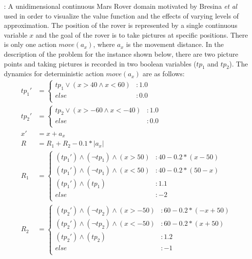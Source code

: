 \MarsRoverUni:
A unidimensional continuous Mars Rover domain motivated by
Bresina {\it et al}~\cite{bresina02} used in order to visualize the
value function and the effects of varying levels of approximation.
The position of the rover is represented by a single continuous
variable $x$ and the goal of the rover is to take pictures at
specific positions.  There is only one action $\mathit{move}(a_x)$,
where $a_x$ is the movement distance. In the description of the
problem for the instance shown below, there are two picture
points and taking pictures is recorded in two boolean variables
($tp_1$ and $tp_2$). The dynamics for deterministic action $move(a_x)$ are as
follows: {\footnotesize
\vspace{-2mm}
\begin{align*}
tp_1' &= \begin{cases}
tp_1 \vee (x>40 \wedge x<60)&: 1.0\\
else&: 0.0\\
\end{cases}\\
tp_2' &= \begin{cases}
tp_2 \vee (x>-60 \wedge x<-40)&: 1.0\\
else&: 0.0\\
\end{cases}\\
x' &=  x +a_x\\
R & = R_1 + R_2 - 0.1*|a_x|\\
R_1 & = \begin{cases} 
(tp_1') \wedge (\neg tp_1) \wedge (x > 50) &: 40 - 0.2*(x -50)\\
(tp_1') \wedge (\neg tp_1) \wedge (x < 50) &: 40 - 0.2*(50-x)\\
(tp_1') \wedge ( tp_1) &:  1.1\\
else &: -2\\
\end{cases} \\
R_2 & = \begin{cases} 
(tp_2') \wedge (\neg tp_2) \wedge (x > -50) &: 60 - 0.2*(-x +50)\\
(tp_2') \wedge (\neg tp_2) \wedge (x < -50) &: 60 - 0.2*(x +50)\\
(tp_2') \wedge ( tp_2) &:  1.2\\
else &: -1\\
\end{cases} \\
\end{align*} }
\vspace{-12 mm}

